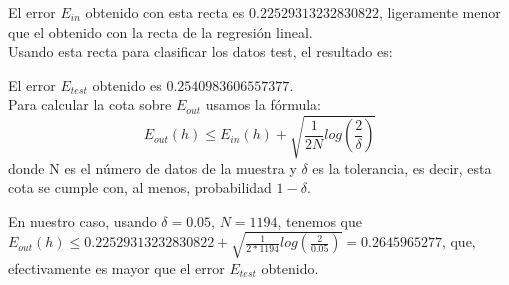 \documentclass{article}
\begin{document}
\begin{figure}[H]
  \centering
\end{figure}

El error $E_{in}$ obtenido con esta recta es $0.22529313232830822$, ligeramente menor que el obtenido con la recta de la regresión lineal.\\

Usando esta recta para clasificar los datos test, el resultado es:

\begin{figure}[H]
  \centering
\end{figure}

El error $E_{test}$ obtenido es $0.2540983606557377$.\\

Para calcular la cota sobre $E_{out}$ usamos la fórmula:
$$E_{out}(h) \leq E_{in}(h) + \sqrt{\frac{1}{2N}log(\frac{2}{\delta})} $$
donde N es el número de datos de la muestra y $\delta$ es la tolerancia, es decir, esta cota se cumple con, al menos, probabilidad $1-\delta$.

En nuestro caso, usando $\delta = 0.05$, $N=1194$, tenemos que $E_{out}(h) \leq 0.22529313232830822 + \sqrt{\frac{1}{2*1194}log(\frac{2}{0.05})} = 0.2645965277$, que, efectivamente es mayor que el error $E_{test}$ obtenido.
\end{document}
